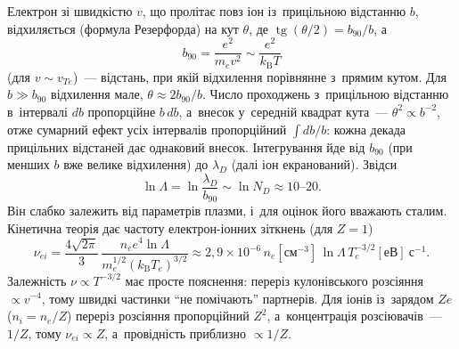 Електрон зі швидкістю $v$, що пролітає повз іон із~прицільною відстанню $b$, відхиляється
(формула Резерфорда) на кут $\theta$, де $\operatorname{tg}(\theta/2)=b_{90}/b$, а~
\begin{equation*}
	b_{90}=\frac{e^2}{m_ev^2}\sim\frac{e^2}{k_{\mathrm B}T}
\end{equation*}
(для $v\sim v_{Te}$)~--- відстань, при якій відхилення порівнянне з~прямим кутом. Для
$b\gg b_{90}$ відхилення мале, $\theta\approx2b_{90}/b$. Число проходжень з~прицільною
відстанню в~інтервалі $db$ пропорційне $b\,db$, а~внесок у~середній квадрат кута~---
$\theta^2\propto b^{-2}$, отже сумарний ефект усіх інтервалів пропорційний $\int db/b$:
кожна декада прицільних відстаней дає однаковий внесок. Інтегрування йде від $b_{90}$ (при
менших $b$ вже велике відхилення) до $\lambda_D$ (далі іон екранований). Звідси
\begin{equation*}
	\ln\Lambda=\ln\frac{\lambda_D}{b_{90}}\sim\ln N_D\approx10\text{--}20.
\end{equation*}
Він слабко залежить від параметрів плазми, і~для оцінок його вважають сталим. Кінетична
теорія дає частоту електрон-іонних зіткнень (для $Z=1$)
\begin{equation}\label{eq:nu-ei}
	\nu_{ei}=\frac{4\sqrt{2\pi}}3\,\frac{n_ee^4\ln\Lambda}{m_e^{1/2}(k_{\mathrm B}T_e)^{3/2}}\approx2{,}9\times10^{-6}\,n_e[\mathrm{см}^{-3}]\,\ln\Lambda\,T_e^{-3/2}[\text{еВ}]~\mathrm{с}^{-1}.
\end{equation}
Залежність $\nu\propto T^{-3/2}$ має просте пояснення: переріз кулонівського розсіяння
$\propto v^{-4}$, тому швидкі частинки \enquote{не помічають} партнерів. Для іонів
із~зарядом $Ze$ ($n_i=n_e/Z$) переріз розсіяння пропорційний $Z^2$, а~концентрація
розсіювачів~--- $1/Z$, тому $\nu_{ei}\propto Z$, а~провідність приблизно $\propto1/Z$.

